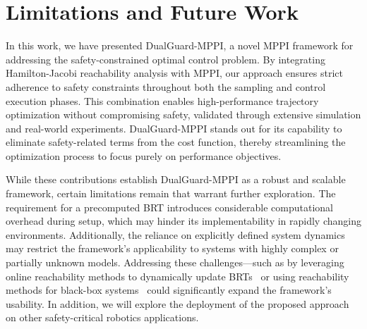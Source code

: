 \section{Limitations and Future Work}
%
In this work, we have presented DualGuard-MPPI, a novel MPPI framework for addressing the safety-constrained optimal control problem. By integrating Hamilton-Jacobi reachability analysis with MPPI, our approach ensures strict adherence to safety constraints throughout both the sampling and control execution phases. This combination enables high-performance trajectory optimization without compromising safety, validated through extensive simulation and real-world experiments. DualGuard-MPPI stands out for its capability to eliminate safety-related terms from the cost function, thereby streamlining the optimization process to focus purely on performance objectives.

While these contributions establish DualGuard-MPPI as a robust and scalable framework, certain limitations remain that warrant further exploration.
The requirement for a precomputed BRT introduces considerable computational overhead during setup, which may hinder its implementability in rapidly changing environments. Additionally, the reliance on explicitly defined system dynamics may restrict the framework's applicability to systems with highly complex or partially unknown models. Addressing these challenges—such as by leveraging online reachability methods to dynamically update BRTs~\cite{warmStart,borquez2023param_cond_reach,EfficientInit2019} or using reachability methods for black-box systems~\cite{blackboxreach2024,RL_reach2021} could significantly expand the framework's usability. In addition, we will explore the deployment of the proposed approach on other safety-critical robotics applications.

